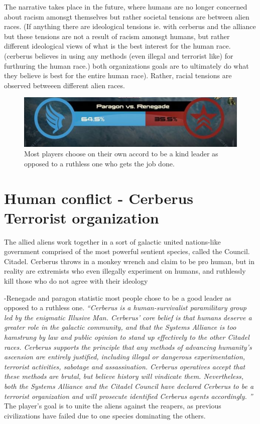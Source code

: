\documentclass[journal]{IEEEtran}
\begin{document}
The narrative takes place in the future, where humans are no longer concerned about racism amonsgt themselves but rather societal
tensions are between alien races. (If anything there are ideological tensions ie. with cerberus and the alliance but these
tensions are not a result of racism amonsgt humans, but rather different ideological views of what is the best interest for the human race. (cerberus believes in using any methods (even illegal and terrorist like) for furthuring the human race.)
both organizations goals are to ultimately do what they believe is best for the entire human race). Rather, racial tensions are observed betweeen different alien races.

\begin{figure}
 \includegraphics[scale=2]{paragon}
 \caption{Most players choose on their own accord to be a kind leader as opposed to a ruthless one who gets the job done. \cite{ea}}
\end{figure}

\section{Human conflict - Cerberus Terrorist organization}
The allied aliens work together in a sort of galactic united nations-like government comprised of the most powerful sentient species, called the Council. Citadel. Cerberus throws in a monkey wrench and claim to be pro human,
but in reality are extremists who even illegally experiment on humans,
and ruthlessly kill those who do not agree with their ideology

-Renegade and paragon statistic most people chose to be a good leader as opposed to a ruthless one.
\textit{``Cerberus is a human-survivalist paramilitary group led by the enigmatic Illusive Man. Cerberus' core belief is that humans deserve a greater role in the galactic community, and that the Systems Alliance is too hamstrung by law and public opinion to stand up effectively to the other Citadel races. Cerberus supports the principle that any methods of advancing humanity's ascension are entirely justified, including illegal or dangerous experimentation, terrorist activities, sabotage and assassination. Cerberus operatives accept that these methods are brutal, but believe history will vindicate them. Nevertheless, both the Systems Alliance and the Citadel Council have declared Cerberus to be a terrorist organization and will prosecute identified Cerberus agents accordingly. ''\cite{wikia}
}
The player's goal is to unite the aliens against the reapers, as
previous civilizations have failed due to one species dominating the others.
\end{document}
